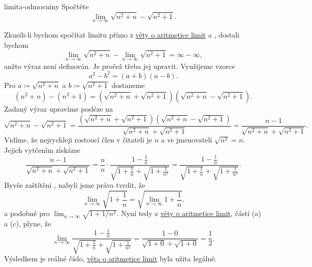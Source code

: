 \begin{problem}{}{limita-odmocniny}
 Spočtěte
 \[
  \lim_{n \to \infty} \sqrt{n^2 + n} - \sqrt{n^2 + 1}.
 \]
\end{problem}
\begin{probsol}
 Zkusili-li bychom spočítat limitu přímo z \hyperref[thm:aritmetika-limit]{věty
 o aritmetice limit} a , dostali bychom
 \[
  \lim_{n \to \infty} \sqrt{n^2 + n} - \lim_{n \to \infty} \sqrt{n^2 + 1} =
  \infty - \infty,
 \]
 anžto výraz není definován. Je pročež třeba jej upravit. Využijeme vzorce
 \[
  a^2 - b^2 = (a+b)(a-b).
 \]
 Pro $a \coloneqq \sqrt{n^2+n}$ a $b \coloneqq \sqrt{n^2+1}$ dostaneme
 \[
  (n^2 + n) - (n^2 + 1) = (\sqrt{n^2 + n} + \sqrt{n^2 + 1})(\sqrt{n^2 + n} -
  \sqrt{n^2 + 1}).
 \]
 Zadaný výraz upravíme posléze na
 \[
  \sqrt{n^2+n} - \sqrt{n^2+1} = \frac{(\sqrt{n^2+n} + \sqrt{n^2+1})(\sqrt{n^2+n}
  - \sqrt{n^2+1})}{\sqrt{n^2+n} + \sqrt{n^2+1}} = \frac{n - 1}{\sqrt{n^2 + n} +
 \sqrt{n^2 + 1}}.
 \]
 Vidíme, že nejrychleji rostoucí člen v čitateli je $n$ a ve jmenovateli
 $\sqrt{n^2} = n$. Jejich vytčením získáme
 \[
  \frac{n-1}{\sqrt{n^2 + n}+\sqrt{n^2+1}} = \frac{n}{n} \cdot \frac{1 -
  \frac{1}{n}}{\sqrt{1 + \frac{1}{n}} + \sqrt{1 + \frac{1}{n^2}}} = \frac{1 -
  \frac{1}{n}}{\sqrt{1 + \frac{1}{n}} + \sqrt{1 + \frac{1}{n^2}}}.
 \]
 Byvše zaštítěni , nabyli jsme práva
 tvrdit, že
 \[
  \lim_{n \to \infty} \sqrt{1 + \frac{1}{n}} = \sqrt{\lim_{n \to \infty} 1 +
  \frac{1}{n}}.
 \]
 a podobně pro $\lim_{n \to \infty} \sqrt{1 + 1 / n^2}$. Nyní tedy z
 \hyperref[thm:aritmetika-limit]{věty o aritmetice limit}, částí (a) a (c),
 plyne, že
 \[
  \lim_{n \to \infty}
  \frac{1-\frac{1}{n}}{\sqrt{1+\frac{1}{n}}+\sqrt{1+\frac{1}{n^2}}} =
  \frac{1-0}{\sqrt{1+0} + \sqrt{1+0}} = \frac{1}{2}.
 \]
 Výsledkem je reálné číslo, \hyperref[thm:aritmetika-limit]{věta o aritmetice
 limit} byla užita legálně.
\end{probsol}
